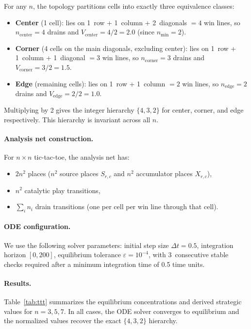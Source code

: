 \documentclass[11pt,a4paper]{article}
\begin{document}
For any $n$, the topology partitions cells into exactly three equivalence classes:
\begin{itemize}
  \item \textbf{Center} (1 cell): lies on 1~row + 1~column + 2~diagonals $= 4$ win lines, so $n_{\mathrm{center}} = 4$ drains and $V_{\mathrm{center}} = 4/2 = 2.0$ (since $n_{\min} = 2$).
  \item \textbf{Corner} (4 cells on the main diagonals, excluding center): lies on 1~row + 1~column + 1~diagonal $= 3$ win lines, so $n_{\mathrm{corner}} = 3$ drains and $V_{\mathrm{corner}} = 3/2 = 1.5$.
  \item \textbf{Edge} (remaining cells): lies on 1~row + 1~column $= 2$ win lines, so $n_{\mathrm{edge}} = 2$ drains and $V_{\mathrm{edge}} = 2/2 = 1.0$.
\end{itemize}

Multiplying by 2 gives the integer hierarchy $\{4, 3, 2\}$ for center, corner, and edge respectively.
This hierarchy is invariant across all $n$.

\paragraph{Analysis net construction.}
For $n \times n$ tic-tac-toe, the analysis net has:
\begin{itemize}
  \item $2n^2$ places ($n^2$ source places $S_{r,c}$ and $n^2$ accumulator places $X_{r,c}$),
  \item $n^2$ catalytic play transitions,
  \item $\sum_i n_i$ drain transitions (one per cell per win line through that cell).
\end{itemize}

\paragraph{ODE configuration.}
We use the following solver parameters: initial step size $\Delta t = 0.5$, integration horizon $[0, 200]$, equilibrium tolerance $\varepsilon = 10^{-4}$, with 3~consecutive stable checks required after a minimum integration time of 0.5 time units.

\paragraph{Results.}
Table~\ref{tab:ttt} summarizes the equilibrium concentrations and derived strategic values for $n = 3, 5, 7$.
In all cases, the ODE solver converges to equilibrium and the normalized values recover the exact $\{4, 3, 2\}$ hierarchy.
\end{document}
